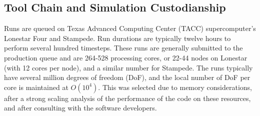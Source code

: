 



\subsection{Tool Chain and Simulation Custodianship}

Runs are queued on Texas Advanced Computing Center (TACC)
supercomputer's Lonestar Four and Stampede. Run durations are typically  
twelve hours to perform several hundred timesteps. 
These runs are generally submitted to the production queue and are  
264-528 processing cores, 
or 22-44 nodes on Lonestar (with 12 cores per node), and a similar number
for Stampede. The runs typically have several million degrees of freedom (DoF), 
and the local number of DoF per core is maintained at $O(10^4)$. This was
selected due to memory considerations, after a strong scaling
analysis of the performance of the code on these resources, and
after consulting with the software developers.  


